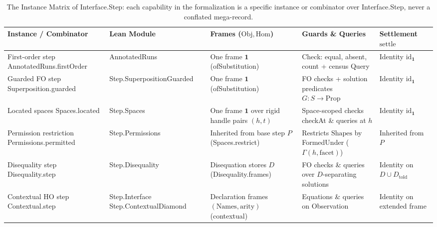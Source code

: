 \documentclass[11pt,a4paper]{article}
\theoremstyle{definition}
\DeclareRobustCommand{\lean}[1]{%
  \ifmmode\text{\normalfont\ttfamily\footnotesize\detokenize{#1}}%
  \else{\normalfont\footnotesize\leanurl{#1}}\fi}
\DeclareRobustCommand{\metta}[1]{\text{\normalfont\ttfamily\footnotesize #1}}
\def\lean#1{#1}%
\def\metta#1{#1}%
\begin{document}
  \begin{table}[t]
\centering
\caption{The Instance Matrix of \lean{Interface.Step}: each capability in the formalization is a specific instance or combinator over \lean{Interface.Step}, never a conflated mega-record.}
\label{tab:instances}
\footnotesize
\setlength{\tabcolsep}{3.5pt}
\renewcommand{\arraystretch}{1.18}
\begin{tabular}{@{}>{\raggedright\arraybackslash}p{3.2cm}>{\raggedright\arraybackslash}p{3.2cm}>{\raggedright\arraybackslash}p{3.0cm}>{\raggedright\arraybackslash}p{3.1cm}>{\raggedright\arraybackslash}p{2.3cm}@{}}
\toprule
\textbf{Instance / Combinator} & \textbf{Lean Module} & \textbf{Frames ($\mathrm{Obj}, \mathrm{Hom}$)} & \textbf{Guards \& Queries} & \textbf{Settlement $\mathrm{settle}$} \\
\midrule
First-order step \newline \lean{AnnotatedRuns.firstOrder} & \lean{AnnotatedRuns} & One frame $\mathbf{1}$ \newline (\lean{ofSubstitution}) & \lean{Check}: \metta{equal}, \metta{absent}, \metta{count} + census \lean{Query} & Identity $\mathrm{id}_{\mathbf{1}}$ \\
Guarded FO step \newline \lean{Superposition.guarded} & \lean{Step.SuperpositionGuarded} & One frame $\mathbf{1}$ \newline (\lean{ofSubstitution}) & FO checks + solution predicates $G : S \to \mathrm{Prop}$ & Identity $\mathrm{id}_{\mathbf{1}}$ \\
Located spaces \newline \lean{Spaces.located} & \lean{Step.Spaces} & One frame $\mathbf{1}$ over rigid handle pairs $(h, t)$ & Space-scoped checks \lean{checkAt} \& queries at $h$ & Identity $\mathrm{id}_{\mathbf{1}}$ \\
Permission restriction \newline \lean{Permissions.permitted} & \lean{Step.Permissions} & Inherited from base step $P$ (\lean{Spaces.restrict}) & Restricts $\mathrm{Shapes}$ by \lean{FormedUnder} ($\Gamma(h,\text{facet})$) & Inherited from $P$ \\
Disequality step \newline \lean{Disequality.step} & \lean{Step.Disequality} & Disequation stores $D$ (\lean{Disequality.frames}) & FO checks \& queries over $D$-separating solutions & Identity on $D \cup D_{\mathrm{told}}$ \\
Contextual HO step \newline \lean{Contextual.step} & \lean{Step.Interface} \newline \lean{Step.ContextualDiamond} & Declaration frames $(\mathrm{Names}, \mathrm{arity})$ (\lean{contextual}) & Equations \& queries on \lean{Observation} & Identity on extended frame \\

\end{tabular}
\end{table}
\end{document}
